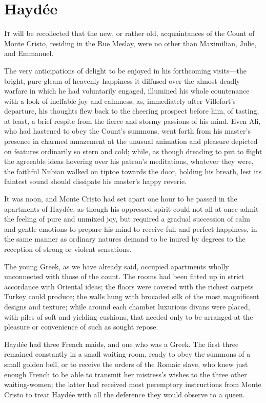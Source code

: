\chapter{Haydée} 

 \lettrine{I}{t} will be recollected that the new, or rather old, acquaintances of the Count of Monte Cristo, residing in the Rue Meslay, were no other than Maximilian, Julie, and Emmanuel. 

\zz
 The very anticipations of delight to be enjoyed in his forthcoming visits—the bright, pure gleam of heavenly happiness it diffused over the almost deadly warfare in which he had voluntarily engaged, illumined his whole countenance with a look of ineffable joy and calmness, as, immediately after Villefort's departure, his thoughts flew back to the cheering prospect before him, of tasting, at least, a brief respite from the fierce and stormy passions of his mind. Even Ali, who had hastened to obey the Count's summons, went forth from his master's presence in charmed amazement at the unusual animation and pleasure depicted on features ordinarily so stern and cold; while, as though dreading to put to flight the agreeable ideas hovering over his patron's meditations, whatever they were, the faithful Nubian walked on tiptoe towards the door, holding his breath, lest its faintest sound should dissipate his master's happy reverie. 

 It was noon, and Monte Cristo had set apart one hour to be passed in the apartments of Haydée, as though his oppressed spirit could not all at once admit the feeling of pure and unmixed joy, but required a gradual succession of calm and gentle emotions to prepare his mind to receive full and perfect happiness, in the same manner as ordinary natures demand to be inured by degrees to the reception of strong or violent sensations. 

 The young Greek, as we have already said, occupied apartments wholly unconnected with those of the count. The rooms had been fitted up in strict accordance with Oriental ideas; the floors were covered with the richest carpets Turkey could produce; the walls hung with brocaded silk of the most magnificent designs and texture; while around each chamber luxurious divans were placed, with piles of soft and yielding cushions, that needed only to be arranged at the pleasure or convenience of such as sought repose. 

 Haydée had three French maids, and one who was a Greek. The first three remained constantly in a small waiting-room, ready to obey the summons of a small golden bell, or to receive the orders of the Romaic slave, who knew just enough French to be able to transmit her mistress's wishes to the three other waiting-women; the latter had received most peremptory instructions from Monte Cristo to treat Haydée with all the deference they would observe to a queen. 

